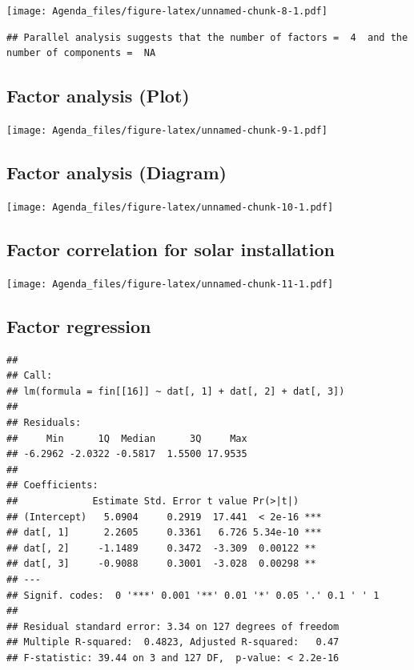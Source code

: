 \documentclass[]{article}
\begin{document}
\texttt{[image: Agenda\_files/figure-latex/unnamed-chunk-8-1.pdf]}

\begin{verbatim}
## Parallel analysis suggests that the number of factors =  4  and the number of components =  NA
\end{verbatim}

\subsection{Factor analysis (Plot)}\label{factor-analysis-plot}

\texttt{[image: Agenda\_files/figure-latex/unnamed-chunk-9-1.pdf]}

\subsection{Factor analysis (Diagram)}\label{factor-analysis-diagram}

\texttt{[image: Agenda\_files/figure-latex/unnamed-chunk-10-1.pdf]}

\subsection{Factor correlation for solar
installation}\label{factor-correlation-for-solar-installation}

\texttt{[image: Agenda\_files/figure-latex/unnamed-chunk-11-1.pdf]}

\subsection{Factor regression}\label{factor-regression}

\begin{verbatim}
## 
## Call:
## lm(formula = fin[[16]] ~ dat[, 1] + dat[, 2] + dat[, 3])
## 
## Residuals:
##     Min      1Q  Median      3Q     Max 
## -6.2962 -2.0322 -0.5817  1.5500 17.9535 
## 
## Coefficients:
##             Estimate Std. Error t value Pr(>|t|)    
## (Intercept)   5.0904     0.2919  17.441  < 2e-16 ***
## dat[, 1]      2.2605     0.3361   6.726 5.34e-10 ***
## dat[, 2]     -1.1489     0.3472  -3.309  0.00122 ** 
## dat[, 3]     -0.9088     0.3001  -3.028  0.00298 ** 
## ---
## Signif. codes:  0 '***' 0.001 '**' 0.01 '*' 0.05 '.' 0.1 ' ' 1
## 
## Residual standard error: 3.34 on 127 degrees of freedom
## Multiple R-squared:  0.4823, Adjusted R-squared:   0.47 
## F-statistic: 39.44 on 3 and 127 DF,  p-value: < 2.2e-16
\end{verbatim}
\end{document}
